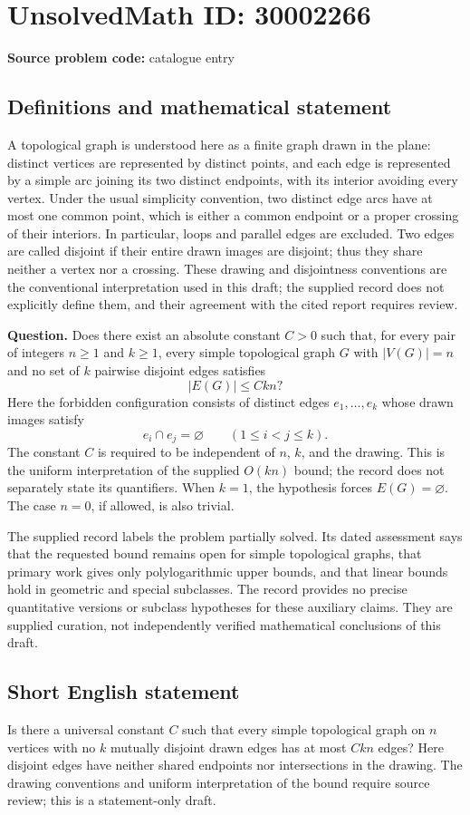 \documentclass[11pt]{article}
\begin{document}
\section*{UnsolvedMath ID: 30002266}
\textbf{Source problem code:} catalogue entry
\subsection{Definitions and mathematical statement}
A topological graph is understood here as a finite graph drawn in the plane: distinct vertices are represented by distinct points, and each edge is represented by a simple arc joining its two distinct endpoints, with its interior avoiding every vertex. Under the usual simplicity convention, two distinct edge arcs have at most one common point, which is either a common endpoint or a proper crossing of their interiors. In particular, loops and parallel edges are excluded. Two edges are called disjoint if their entire drawn images are disjoint; thus they share neither a vertex nor a crossing. These drawing and disjointness conventions are the conventional interpretation used in this draft; the supplied record does not explicitly define them, and their agreement with the cited report requires review.

\textbf{Question.} Does there exist an absolute constant \(C>0\) such that, for every pair of integers \(n\geq 1\) and \(k\geq 1\), every simple topological graph \(G\) with \(|V(G)|=n\) and no set of \(k\) pairwise disjoint edges satisfies
\[
|E(G)|\leq Ckn?
\]
Here the forbidden configuration consists of distinct edges \(e_1,\ldots,e_k\) whose drawn images satisfy
\[
e_i\cap e_j=\varnothing\qquad(1\leq i<j\leq k).
\]
The constant \(C\) is required to be independent of \(n\), \(k\), and the drawing. This is the uniform interpretation of the supplied \(O(kn)\) bound; the record does not separately state its quantifiers. When \(k=1\), the hypothesis forces \(E(G)=\varnothing\). The case \(n=0\), if allowed, is also trivial.

The supplied record labels the problem partially solved. Its dated assessment says that the requested bound remains open for simple topological graphs, that primary work gives only polylogarithmic upper bounds, and that linear bounds hold in geometric and special subclasses. The record provides no precise quantitative versions or subclass hypotheses for these auxiliary claims. They are supplied curation, not independently verified mathematical conclusions of this draft.
\subsection{Short English statement}
Is there a universal constant \(C\) such that every simple topological graph on \(n\) vertices with no \(k\) mutually disjoint drawn edges has at most \(Ckn\) edges? Here disjoint edges have neither shared endpoints nor intersections in the drawing. The drawing conventions and uniform interpretation of the bound require source review; this is a statement-only draft.
\end{document}
